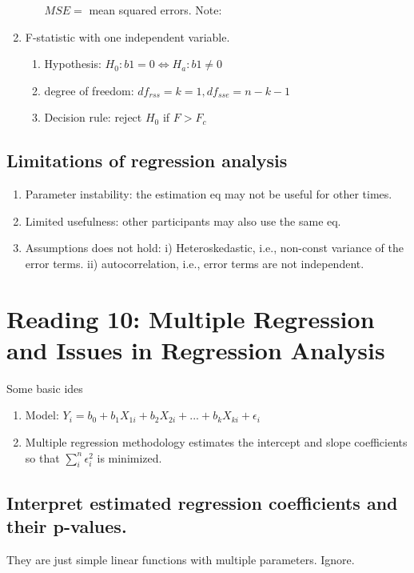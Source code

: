 \documentclass{article}
\begin{document}
\begin{enumerate}
\begin{enumerate}
                       $MSE=$ mean squared errors. 
                       Note: \color{red}{One tailed test!}
        \end{enumerate}
    \item F-statistic with one independent variable.
        \begin{enumerate}
            \item Hypothesis: $H_0: b1=0 \Leftrightarrow H_a: b1\ne 0$
            \item degree of freedom: $df_{rss}=k=1,df_{sse}=n-k-1$
            \item Decision rule: reject $H_0$ if $F>F_c$
        \end{enumerate}
\end{enumerate}
\subsection{Limitations of regression analysis}
    \begin{enumerate}
        \item Parameter instability: the estimation eq may not be useful for other times.
        \item Limited usefulness: other participants may also use the same eq.
        \item Assumptions does not hold: i) Heteroskedastic, i.e., non-const
            variance of the error terms. ii) autocorrelation, i.e., error terms
            are not independent.
    \end{enumerate}

\section{Reading 10: Multiple Regression and Issues in Regression Analysis}
Some basic ides
    \begin{enumerate}
        \item Model: 
            $Y_i=b_0+b_1 X_{1i}+b_2 X_{2i}+...+b_k X_{ki}+\epsilon_i$
        \item Multiple regression methodology estimates the intercept and 
            slope coefficients so that $\sum_i^n \epsilon_i^2$ is minimized.
    \end{enumerate}
\subsection{Interpret estimated regression coefficients and their p-values.}
They are just simple linear functions with multiple parameters. Ignore.
\end{document}
